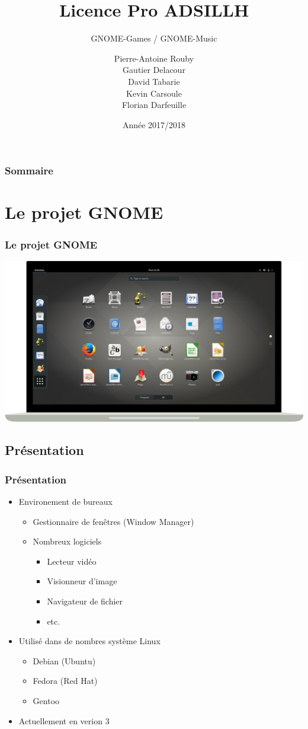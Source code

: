\documentclass{beamer}
\title{Licence Pro ADSILLH}
\subtitle{GNOME-Games / GNOME-Music}
\author{Pierre-Antoine Rouby\\Gautier Delacour\\
  David Tabarie\\Kevin Carsoule\\Florian Darfeuille}
\date{Année 2017/2018}
\begin{document}
\frame{\titlepage}

\begin{frame}
  \frametitle{Sommaire}
  \tableofcontents
\end{frame}

\section{Le projet GNOME}
\begin{frame}
  \frametitle{Le projet GNOME}
  \includegraphics[scale=0.2]{images/GnomeScreen.png}
\end{frame}

\subsection{Présentation}
\begin{frame}
  \frametitle{Présentation}
  \begin{itemize}
  \item Environement de bureaux \pause
    \begin{itemize}
    \item Gestionnaire de fenêtres (Window Manager) \pause
    \item Nombreux logiciels \pause
      \begin{itemize} %
      \item Lecteur vidéo
      \item Visionneur d'image
      \item Navigateur de fichier
      \item etc. \pause
      \end{itemize}
    \end{itemize}
  \item Utilisé dans de nombres système Linux \pause
    \begin{itemize}
    \item Debian (Ubuntu)
    \item Fedora (Red Hat)
    \item Gentoo \pause
    \end{itemize}
  \item Actuellement en verion 3
  \end{itemize}
\end{frame}
\end{document}
